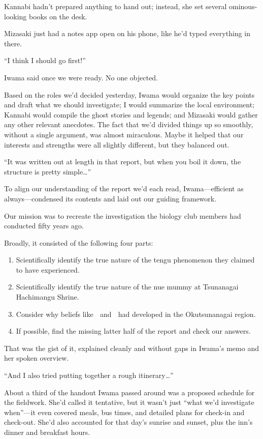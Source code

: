 \documentclass[
    a4paper,
    12pt,
    twoside,
    openany,
    UTF8,
    fontset=windows
]{ctexbook}
\newcommand{\circled}[1]{%
  \textcircled{\raisebox{-0.9pt}{\fontsize{9}{9}\selectfont #1}}%
}
\begin{document}
Kannabi hadn't prepared anything to hand out; instead, she set several ominous-looking books on the desk.

Mizasaki just had a notes app open on his phone, like he'd typed everything in there.

``I think I should go first!''

Iwama said once we were ready. No one objected.

Based on the roles we'd decided yesterday, Iwama would organize the key points and draft what we should investigate; I would summarize the local environment; Kannabi would compile the ghost stories and legends; and Mizasaki would gather any other relevant anecdotes. The fact that we'd divided things up so smoothly, without a single argument, was almost miraculous. Maybe it helped that our interests and strengths were all slightly different, but they balanced out.

``It was written out at length in that report, but when you boil it down, the structure is pretty simple\dots''

To align our understanding of the report we'd each read, Iwama---efficient as always---condensed its contents and laid out our guiding framework.

Our mission was to recreate the investigation the biology club members had conducted fifty years ago.

Broadly, it consisted of the following four parts:

{\bfseries
\begin{enumerate}[label=\circled{\arabic*}]
\item Scientifically identify the true nature of the tengu phenomenon they claimed to have experienced.
\item Scientifically identify the true nature of the nue mummy at Tsunanagai Hachimangu Shrine.
\item Consider why beliefs like \circled{1} and \circled{2} had developed in the Okutsunanagai region.
\item If possible, find the missing latter half of the report and check our answers.
\end{enumerate}
}

That was the gist of it, explained cleanly and without gaps in Iwama's memo and her spoken overview.

``And I also tried putting together a rough itinerary\dots''

About a third of the handout Iwama passed around was a proposed schedule for the fieldwork. She'd called it tentative, but it wasn't just ``what we'd investigate when''---it even covered meals, bus times, and detailed plans for check-in and check-out. She'd also accounted for that day's sunrise and sunset, plus the inn's dinner and breakfast hours.
\end{document}
